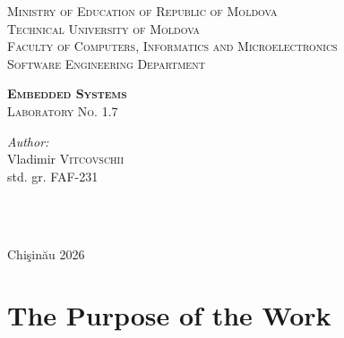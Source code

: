 \documentclass[12pt]{article}
\begin{document}
\begin{titlepage}
   \begin{center}
    \textsc{\large Ministry of Education of Republic of Moldova}\\[0.5cm]
    \textsc{\large Technical University of Moldova}\\[0.5cm]
    \textsc{\large Faculty of Computers, Informatics and Microelectronics}\\[0.5cm]
    \textsc{\large Software Engineering Department}\\[1.2cm]

    \vspace{25mm}

    {\LARGE \textbf{\textsc{Embedded Systems}}}\\[0.5cm]
    \textsc{\large Laboratory No. 1.7}\\[0.5cm]

    \newcommand{\HRule}{\rule{\linewidth}{0.5mm}}
    \vspace{80mm}

    \begin{minipage}[t]{0.4\textwidth}
    \begin{flushleft} \large
    \emph{Author:} \\
    Vladimir \textsc{Vitcovschii}\\
    std. gr. FAF-231
    \end{flushleft}
    \end{minipage}
    ~
    \begin{minipage}[t]{0.4\textwidth}
    \begin{flushright} \large
    \end{flushright}
    \end{minipage}\\[3cm]

    \vspace{5mm}
    \large Chi\c{s}in\u{a}u 2026\\[0.5cm]

    \vfill
    \end{center}
\end{titlepage}

\clearpage
\tableofcontents
\clearpage

\setcounter{page}{2}
\pagestyle{fancy}
\fancyhf{}
\rhead{\thepage}

\section{The Purpose of the Work}
\end{document}
